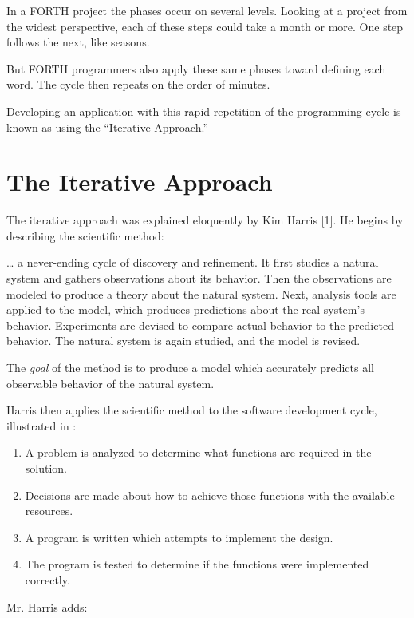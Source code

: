 In a FORTH project the phases occur on several levels. Looking at a
project from the widest perspective, each of these steps could take a
month or more.  One step follows the next, like seasons.


But FORTH programmers also apply these same phases toward
defining each word. The cycle then repeats on the order of minutes.

Developing an application with this rapid repetition of the
programming cycle is known as using the ``Iterative Approach.''

\section{The Iterative Approach}

The iterative approach was explained eloquently by Kim
Harris {[}1{]}. He begins by describing the scientific method:

\begin{tfquot}
\dots{} a never-ending cycle of discovery and refinement. It first
studies a natural system and gathers observations about its behavior.
Then the observations are modeled to produce a theory about the
natural system. Next, analysis tools are applied to the model, which
produces predictions about the real system's behavior. Experiments
are devised to compare actual behavior to the predicted behavior. The
natural system is again studied, and the model is revised.

The \emph{goal} of the method is to produce a model which accurately predicts all
observable behavior of the natural system.
\end{tfquot}
Harris then applies the scientific method to the software development
cycle, illustrated in :


\begin{enumerate}
\item A problem is analyzed to determine what functions are required in the solution.
\item Decisions are made about how to achieve those functions with
the available resources.
\item A program is written which attempts to implement the design.
\item The program is tested to determine if the functions were implemented correctly.
\end{enumerate}
Mr. Harris adds:

